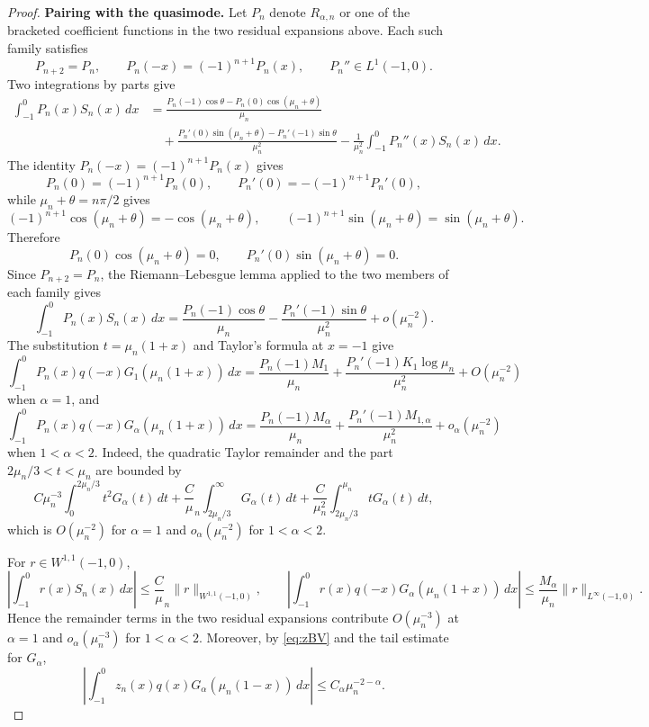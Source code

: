 \documentclass[11pt]{amsart}
\numberwithin{equation}{section}
\theoremstyle{remark}
\newcommand{\norm}[2][]{\lVert #2\rVert_{#1}}
\begin{document}
\begin{proof}
\medskip
\noindent\textbf{Pairing with the quasimode.}\quad
Let $P_n$ denote $R_{\alpha,n}$ or one of the bracketed coefficient
functions in the two residual expansions above.  Each such family satisfies
\[
 P_{n+2}=P_n,
 \qquad
 P_n(-x)=(-1)^{n+1}P_n(x),
 \qquad
 P_n''\in L^1(-1,0).
\]
Two integrations by parts give
\[
 \begin{aligned}
 \int_{-1}^0P_n(x)S_n(x)\,dx
 &=\frac{P_n(-1)\cos\theta-P_n(0)\cos(\mu_n+\theta)}{\mu_n}\\
 &\quad+\frac{P_n'(0)\sin(\mu_n+\theta)-P_n'(-1)\sin\theta}{\mu_n^2}
 -\frac1{\mu_n^2}\int_{-1}^0P_n''(x)S_n(x)\,dx.
 \end{aligned}
\]
The identity $P_n(-x)=(-1)^{n+1}P_n(x)$ gives
\[
 P_n(0)=(-1)^{n+1}P_n(0),
 \qquad
 P_n'(0)=-(-1)^{n+1}P_n'(0),
\]
while $\mu_n+\theta=n\pi/2$ gives
\[
 (-1)^{n+1}\cos(\mu_n+\theta)=-\cos(\mu_n+\theta),
 \qquad
 (-1)^{n+1}\sin(\mu_n+\theta)=\sin(\mu_n+\theta).
\]
Therefore
\[
 P_n(0)\cos(\mu_n+\theta)=0,
 \qquad
 P_n'(0)\sin(\mu_n+\theta)=0.
\]
Since $P_{n+2}=P_n$, the Riemann--Lebesgue lemma applied to the two
members of each family gives
\[
 \int_{-1}^0P_n(x)S_n(x)\,dx
 =\frac{P_n(-1)\cos\theta}{\mu_n}
 -\frac{P_n'(-1)\sin\theta}{\mu_n^2}+o(\mu_n^{-2}).
\]
The substitution $t=\mu_n(1+x)$ and Taylor's formula at $x=-1$ give
\[
 \int_{-1}^0P_n(x)q(-x)G_1(\mu_n(1+x))\,dx
 =\frac{P_n(-1)M_1}{\mu_n}
 +\frac{P_n'(-1)K_1\log\mu_n}{\mu_n^2}+O(\mu_n^{-2})
\]
when $\alpha=1$, and
\[
 \int_{-1}^0P_n(x)q(-x)G_\alpha(\mu_n(1+x))\,dx
 =\frac{P_n(-1)M_\alpha}{\mu_n}
 +\frac{P_n'(-1)M_{1,\alpha}}{\mu_n^2}+o_\alpha(\mu_n^{-2})
\]
when $1<\alpha<2$.  Indeed, the quadratic Taylor remainder and the part
$2\mu_n/3<t<\mu_n$ are bounded by
\[
 C\mu_n^{-3}\int_0^{2\mu_n/3}t^2G_\alpha(t)\,dt
 +\frac C\mu_n\int_{2\mu_n/3}^\infty G_\alpha(t)\,dt
 +\frac C{\mu_n^2}\int_{2\mu_n/3}^{\mu_n}tG_\alpha(t)\,dt,
\]
which is $O(\mu_n^{-2})$ for $\alpha=1$ and $o_\alpha(\mu_n^{-2})$ for
$1<\alpha<2$.

For $r\in W^{1,1}(-1,0)$,
\[
 \left|\int_{-1}^0r(x)S_n(x)\,dx\right|
 \le\frac C\mu_n\norm[W^{1,1}(-1,0)]{r},
 \qquad
 \left|\int_{-1}^0r(x)q(-x)G_\alpha(\mu_n(1+x))\,dx\right|
 \le\frac{M_\alpha}{\mu_n}\norm[L^\infty(-1,0)]{r}.
\]
Hence the remainder terms in the two residual expansions contribute $O(\mu_n^{-3})$ at $\alpha=1$ and
$o_\alpha(\mu_n^{-3})$ for $1<\alpha<2$.  Moreover, by \eqref{eq:zBV} and the
tail estimate for $G_\alpha$,
\[
 \left|\int_{-1}^0z_n(x)q(x)G_\alpha(\mu_n(1-x))\,dx\right|
 \le C_\alpha\mu_n^{-2-\alpha}.
\]


\end{proof}
\end{document}
